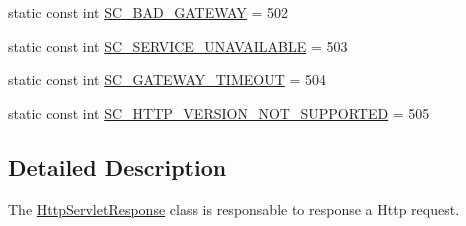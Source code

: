 \begin{DoxyCompactItemize}
\item 
static const int \hyperlink{class_c_w_f_1_1_http_servlet_response_a4a3c83d68b706e422fc2c527996e55d0}{S\+C\+\_\+\+B\+A\+D\+\_\+\+G\+A\+T\+E\+W\+A\+Y} = 502
\item 
static const int \hyperlink{class_c_w_f_1_1_http_servlet_response_aeb80280d784470cf02c3a17c9c035822}{S\+C\+\_\+\+S\+E\+R\+V\+I\+C\+E\+\_\+\+U\+N\+A\+V\+A\+I\+L\+A\+B\+L\+E} = 503
\item 
static const int \hyperlink{class_c_w_f_1_1_http_servlet_response_ab4dbd5c923e4a66dbbc7a3f5801fd1a9}{S\+C\+\_\+\+G\+A\+T\+E\+W\+A\+Y\+\_\+\+T\+I\+M\+E\+O\+U\+T} = 504
\item 
static const int \hyperlink{class_c_w_f_1_1_http_servlet_response_a105b64e573a5c1cf04f6552225bddf54}{S\+C\+\_\+\+H\+T\+T\+P\+\_\+\+V\+E\+R\+S\+I\+O\+N\+\_\+\+N\+O\+T\+\_\+\+S\+U\+P\+P\+O\+R\+T\+E\+D} = 505
\end{DoxyCompactItemize}


\subsection{Detailed Description}
The \hyperlink{class_c_w_f_1_1_http_servlet_response}{Http\+Servlet\+Response} class is responsable to response a Http request. 

